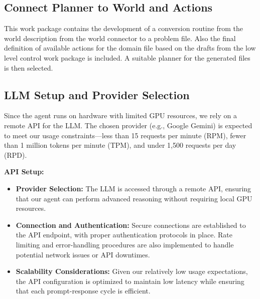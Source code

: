 \documentclass{article}
\begin{document}
\subsection{Connect Planner to World and Actions}

This work package contains the development of a conversion routine from the world description from the world connector to a problem file. Also the final definition of available actions for the domain file based on the drafts from the low level control work package is included. 
A suitable planner for the generated files is then selected.

\subsection{LLM Setup and Provider Selection}

Since the agent runs on hardware with limited GPU resources, we rely on a remote API for the LLM. The chosen provider (e.g., Google Gemini) is expected to meet our usage constraints—less than 15 requests per minute (RPM), fewer than 1 million tokens per minute (TPM), and under 1,500 requests per day (RPD).


\textbf{API Setup:}
\begin{itemize}
    \item \textbf{Provider Selection:}  
    The LLM is accessed through a remote API, ensuring that our agent can perform advanced reasoning without requiring local GPU resources.
    
    \item \textbf{Connection and Authentication:}  
    Secure connections are established to the API endpoint, with proper authentication protocols in place. Rate limiting and error-handling procedures are also implemented to handle potential network issues or API downtimes.
    
    \item \textbf{Scalability Considerations:}  
    Given our relatively low usage expectations, the API configuration is optimized to maintain low latency while ensuring that each prompt-response cycle is efficient.
\end{itemize}
\end{document}
